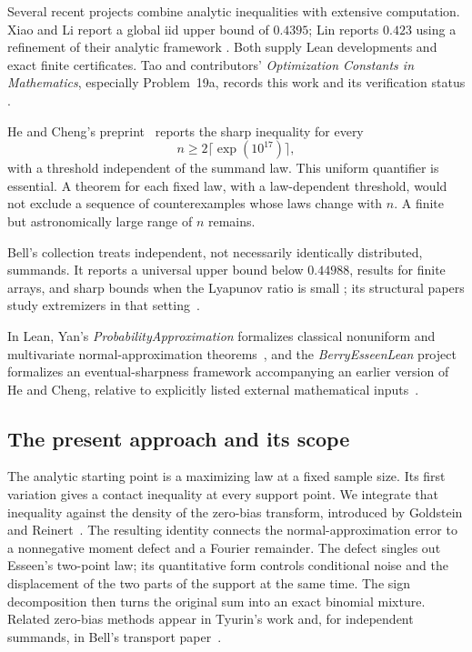 Several recent projects combine analytic inequalities with extensive
computation. Xiao and Li report a global iid upper bound of $0.4395$;
Lin reports $0.423$ using a refinement of their analytic framework
\cite{xiao2026berryesseen,lin2026berryesseen}. Both supply Lean
developments and exact finite certificates. Tao and contributors' \emph{Optimization Constants in Mathematics},
especially Problem~19a, records this work and its verification status
\cite{tao2026berryesseenregistry}.

He and Cheng's preprint~\cite{hecheng2026eventually} reports the sharp
inequality for every
\[
 n\ge 2\lceil\exp(10^{17})\rceil,
\]
with a threshold independent of the summand law. This uniform quantifier
is essential. A theorem for each fixed law, with a law-dependent
threshold, would not exclude a sequence of counterexamples whose laws
change with $n$. A finite but astronomically large range of $n$ remains.

Bell's collection treats independent, not necessarily identically
distributed, summands. It reports a universal upper bound below
$0.44988$, results for finite arrays, and sharp bounds when the Lyapunov
ratio is small \cite{BellIndependent2026,BellFinite2026,BellSmall2026};
its structural papers study extremizers in that
setting~\cite{BellExtremizers2026,BellStructural2026}.

In Lean, Yan's \emph{ProbabilityApproximation} formalizes classical
nonuniform and multivariate normal-approximation
theorems~\cite{Yan2026ProbabilityApproximation}, and the
\emph{BerryEsseenLean} project formalizes an eventual-sharpness framework accompanying an earlier version of He
and Cheng, relative to explicitly listed external mathematical inputs~\cite{BerryEsseenLean2026}.

\subsection{The present approach and its scope}\label{ms:scope}

The analytic starting point is a maximizing law at a fixed sample size.
Its first variation gives a contact inequality at every support point.
We integrate that inequality against the density of the zero-bias
transform, introduced by Goldstein and Reinert~\cite{GoldsteinReinert1997}.
The resulting identity connects the normal-approximation error to a
nonnegative moment defect and a Fourier remainder. The defect singles out
Esseen's two-point law; its quantitative form controls conditional noise
and the displacement of the two parts of the support at the same time.
The sign decomposition then turns the original sum into an exact binomial
mixture. Related zero-bias methods appear in Tyurin's work and, for
independent summands, in Bell's transport paper~\cite{Tyurin2010,BellTransport2026}.

